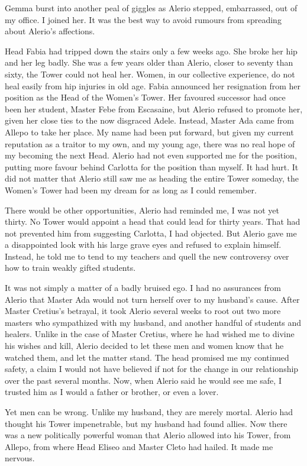 \documentclass{article}
\begin{document}
Gemma burst into another peal of giggles as Alerio stepped, embarrassed, out of my office. I joined her. It was the best way to avoid rumours from spreading about Alerio's affections. 

Head Fabia had tripped down the stairs only a few weeks ago. She broke her hip and her leg badly. She was a few years older than Alerio, closer to seventy than sixty, the Tower could not heal her. Women, in our collective experience, do not heal easily from hip injuries in old age. Fabia announced her resignation from her position as the Head of the Women's Tower. Her favoured successor had once been her student, Master Febe from Escasaine, but Alerio refused to promote her, given her close ties to the now disgraced Adele. Instead, Master Ada came from Allepo to take her place. My name had been put forward, but given my current reputation as a traitor to my own, and my young age, there was no real hope of my becoming the next Head. Alerio had not even supported me for the position, putting more favour behind Carlotta for the position than myself. It had hurt. It did not matter that Alerio still saw me as heading the entire Tower someday, the Women's Tower had been my dream for as long as I could remember. 

There would be other opportunities, Alerio had reminded me, I was not yet thirty. No Tower would appoint a head that could lead for thirty years. That had not prevented him from suggesting Carlotta, I had objected. But Alerio gave me a disappointed look with his large grave eyes and refused to explain himself. Instead, he told me to tend to my teachers and quell the new controversy over how to train weakly gifted students. 

It was not simply a matter of a badly bruised ego. I had no assurances from Alerio that Master Ada would not turn herself over to my husband's cause. After Master Cretius's betrayal, it took Alerio several weeks to root out two more masters who sympathized with my husband, and another handful of students and healers. Unlike in the case of Master Cretius, where he had wished me to divine his wishes and kill, Alerio decided to let these men and women know that he watched them, and let the matter stand. The head promised me my continued safety, a claim I would not have believed if not for the change in our relationship over the past several months. Now, when Alerio said he would see me safe, I trusted him as I would a father or brother, or even a lover. 

Yet men can be wrong. Unlike my husband, they are merely mortal. Alerio had thought his Tower impenetrable, but my husband had found allies. Now there was a new politically powerful woman that Alerio allowed into his Tower, from Allepo, from where Head Eliseo and Master Cleto had hailed. It made me nervous. 
\end{document}
